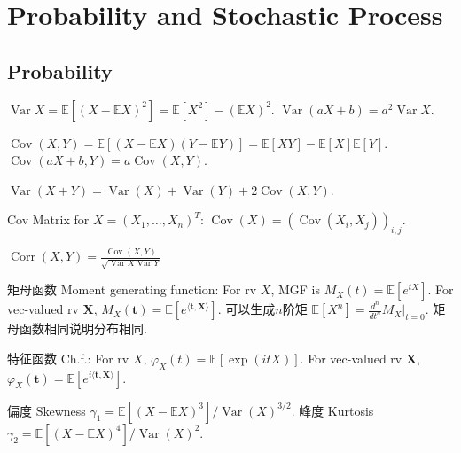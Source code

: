 \documentclass[UTF8]{ctexart}
\begin{document}
\section{Probability and Stochastic Process}

\subsection{Probability}

$\operatorname{Var}X = \mathbb{E}[(X-\mathbb{E}X)^2] = \mathbb{E}[X^2]-(\mathbb{E}X)^2$.
$\operatorname{Var}(aX+b) = a^2 \operatorname{Var}X$.

$\operatorname{Cov}(X,Y) = \mathbb{E}[(X-\mathbb{E}X)(Y-\mathbb{E}Y)]
	= \mathbb{E}[XY]-\mathbb{E}[X]\mathbb{E}[Y]$.
$\operatorname{Cov}(aX+b,Y) = a\operatorname{Cov}(X,Y)$.

$\operatorname{Var}(X+Y)=\operatorname{Var}(X)+\operatorname{Var}(Y)+2\operatorname{Cov}(X,Y)$.

Cov Matrix for $X=(X_1,\dots,X_n)^T$: $\operatorname{Cov}(X) = (\operatorname{Cov}(X_i,X_j))_{i,j}$.

$\operatorname{Corr}(X,Y)=\frac{\operatorname{Cov}(X,Y)}{\sqrt{\operatorname{Var}X \operatorname{Var}Y}}$

矩母函数 Moment generating function: For rv $X$, MGF is $M_X(t)=\mathbb{E}[e^{tX}]$.
For vec-valued rv $\mathbf{X}$, $M_X(\mathbf{t})=\mathbb{E}[e^{\langle \mathbf{t},\mathbf{X} \rangle }]$.
可以生成$n$阶矩 $\mathbb{E}[X^n]=\frac{d^n}{dt^n}M_X \Big| _{t=0}$. 矩母函数相同说明分布相同.

特征函数 Ch.f.: For rv $X$, $\varphi_X(t)=\mathbb{E} [\exp(itX)]$.
For vec-valued rv $\mathbf{X}$, $\varphi_X(\mathbf{t})=\mathbb{E}[e^{i \langle \mathbf{t},\mathbf{X} \rangle }]$.

偏度 Skewness $\gamma_1 = \mathbb{E}[(X-\mathbb{E}X)^3] / \operatorname{Var}(X)^{3/2}$.
峰度 Kurtosis $\gamma_2 = \mathbb{E}[(X-\mathbb{E}X)^4] / \operatorname{Var}(X)^{2}$.
\end{document}
